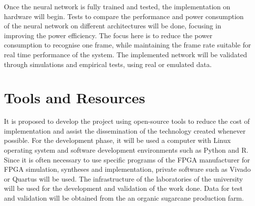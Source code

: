 \documentclass[
    12pt,                       %
    oneside,                    %
    a4paper,                    %
    brazil,                     %
    french,                     %
    spanish,                    %
    english,                    %
    ]{abntex2}
\begin{document}
Once the neural network is fully trained and tested, the implementation on hardware will begin. Tests to compare the performance and power consumption of the neural network on different architectures will be done, focusing in improving the power efficiency. The focus here is to reduce the power consumption to recognise one frame, while maintaining the frame rate suitable for real time performance of the system. The implemented network will be validated through simulations and empirical tests, using real or emulated data.


\section{Tools and Resources}

  It is proposed to develop the project using open-source tools to reduce the cost of implementation and assist the dissemination of the technology created whenever possible. For the development phase, it will be used a computer with Linux operating system and software development environments such as Python and R. Since it is often necessary to use specific programs of the FPGA manufacturer for FPGA simulation, syntheses and implementation, private software such as Vivado or Quartus will be used. The infrastructure of the laboratories of the university will be used for the development and validation of the work done. Data for test and validation will be obtained from the an organic sugarcane production farm.
\end{document}
